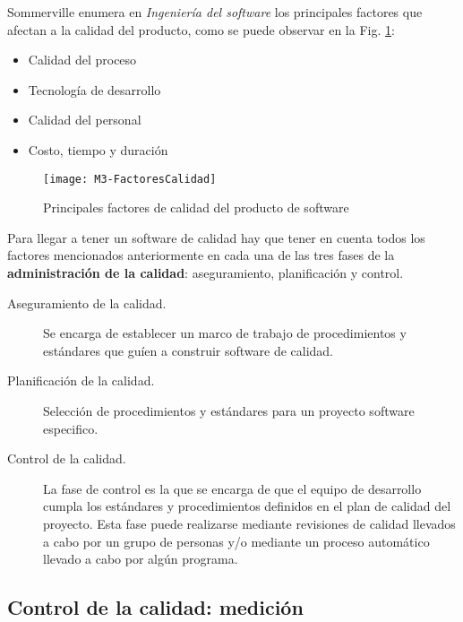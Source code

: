 Sommerville enumera en \textit{Ingeniería del software} \citep{sommerville_ingenierisoftware_2002} los principales factores que afectan a la calidad del producto, como se puede observar en la Fig. \ref{fig:M3-FactoresCalidad}:
\begin{itemize}
	\tightlist
	\item Calidad del proceso
	\item Tecnología de desarrollo
	\item Calidad del personal
	\item Costo, tiempo y duración
\end{itemize}
\begin{figure}[!h]
	\centering
	\texttt{[image: M3-FactoresCalidad]}
	\caption{Principales factores de calidad del producto de software \citep{sommerville_ingenierisoftware_2002}}\label{fig:M3-FactoresCalidad}
\end{figure}
\FloatBarrier


Para llegar a tener un software de calidad hay que tener en cuenta todos los factores mencionados anteriormente en cada una de las tres fases de la \textbf{administración de la calidad}: aseguramiento, planificación y control.

\begin{description}
	\item[Aseguramiento de la calidad.] Se encarga de establecer un marco de trabajo de procedimientos y estándares que guíen a construir software de calidad.
	\item[Planificación de la calidad.] Selección de procedimientos y estándares para un proyecto software especifico.
	\item[Control de la calidad.] La fase de control es la que se encarga de que el equipo de desarrollo cumpla los estándares y procedimientos definidos en el plan de calidad del proyecto. Esta fase puede realizarse mediante revisiones de calidad llevados a cabo por un grupo de personas y/o mediante un proceso automático llevado a cabo por algún programa.
\end{description}


\subsection{Control de la calidad: medición}

